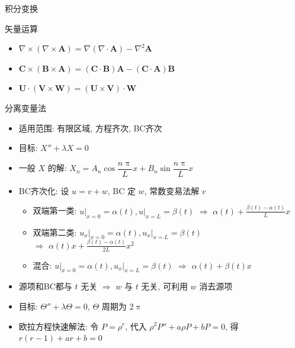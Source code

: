 \documentclass[landscape,a4paper]{ctexart}
\begin{document}
\begin{cheatsheetcolumns}
\begin{card}{积分变换}
\begin{itemize}
			\end{itemize}
		\end{card}
		\begin{card}{矢量运算}
			\begin{itemize}
				\item $\nabla\times\left(\nabla\times\mathbf{A}\right)=\nabla\left(\nabla\cdot\mathbf{A}\right)-\nabla^2\mathbf{A}$
				\item $\mathbf{C}\times\left(\mathbf{B}\times\mathbf{A}\right)=\left(\mathbf{C}\cdot\mathbf{B}\right)\mathbf{A}-\left(\mathbf{C}\cdot\mathbf{A}\right)\mathbf{B}$
				\item $\mathbf{U}\cdot\left(\mathbf{V}\times\mathbf{W}\right)=\left(\mathbf{U}\times\mathbf{V}\right)\cdot\mathbf{W}$
			\end{itemize}
		\end{card}
		\begin{card}{分离变量法}
			\begin{itemize}
			\item 适用范围: 有限区域, 方程齐次, BC齐次\\
			\item 目标: $X''+\lambda X=0$
			\item 一般 $X$ 的解: $X_n=A_n\cos\dfrac{n\uppi}{L}x+B_n\sin\dfrac{n\uppi}{L}x$
			\item BC齐次化: 设 $u=v+w$, BC 定 $w$, 常数变易法解 $v$
			\begin{itemize}
				\item 双端第一类: $\left.u\right|_{x=0}=\alpha(t),\left.u\right|_{x=L}=\beta(t)$ $\Rightarrow$ $\alpha(t)+\frac{\beta(t)-\alpha(t)}{L}x$
				\item 双端第二类: $\left.u_x\right|_{x=0}=\alpha(t),\left.u_x\right|_{x=L}=\beta(t)$\\ $\Rightarrow$ $\alpha(t)x+\frac{\beta(t)-\alpha(t)}{2L}x^2$
				\item 混合: $\left.u\right|_{x=0}=\alpha(t),\left.u_x\right|_{x=L}=\beta(t)$ $\Rightarrow$ $\alpha(t)+\beta(t)x$
			\end{itemize}
			\item 源项和BC都与 $t$ 无关 $\Rightarrow$ $w$ 与 $t$ 无关, 可利用 $w$ 消去源项
			\item 目标: $\Theta''+\lambda\Theta=0$, $\Theta$ 周期为 $2\uppi$
			\item 欧拉方程快速解法: 令 $P=\rho^r$, 代入 $\rho^2 P''+a\rho P+bP=0$, 得 $r(r-1)+ar+b=0$\\

\end{itemize}
\end{card}
\end{cheatsheetcolumns}
\end{document}
